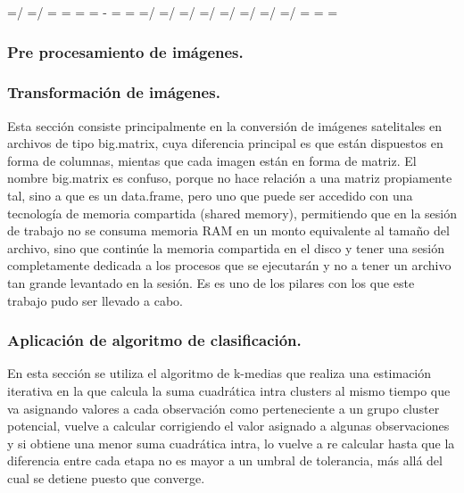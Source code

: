 \documentclass[]{article}
\makeatletter
\def\vcoef#1{#1=\dimexpr #1*\pdfpageheight/\paperheight\relax}
\def\hcoef#1{#1=\dimexpr #1*\pdfpagewidth/\paperwidth\relax}
\def\adjustpagedim#1#2{%
\newpage
\pdfpagewidth=#1 \pdfpageheight=#2
\hcoef\textwidth
\vcoef\textheight
\vsize=\textheight
\@colroom=\textheight
\@colht=\textheight
\columnwidth=\textwidth
\if@twocolumn%
   \advance\columnwidth-\columnsep
   \divide\columnwidth\tw@%
   \@firstcolumntrue%
\fi%
\hsize=\columnwidth
\linewidth=\hsize
\hcoef\evensidemargin
\hcoef\oddsidemargin
\vcoef\topmargin
\vcoef\headheight
\vcoef\headsep
\vcoef\footskip
\hcoef\marginparwidth
\hcoef\marginparsep
\headwidth=\textwidth
\paperwidth=\pdfpagewidth
\paperheight=\pdfpageheight}
\makeatother
\begin{document}
\newpage

\adjustpagedim{502.9mm}{388.6mm}

\subsubsection{Pre procesamiento de
imágenes.}\label{pre-procesamiento-de-imagenes.}



\newpage

\subsubsection{Transformación de
imágenes.}\label{transformacion-de-imagenes.}

Esta sección consiste principalmente en la conversión de imágenes
satelitales en archivos de tipo big.matrix, cuya diferencia principal es
que están dispuestos en forma de columnas, mientas que cada imagen están
en forma de matriz. El nombre big.matrix es confuso, porque no hace
relación a una matriz propiamente tal, sino a que es un data.frame, pero
uno que puede ser accedido con una tecnología de memoria compartida
(shared memory), permitiendo que en la sesión de trabajo no se consuma
memoria RAM en un monto equivalente al tamaño del archivo, sino que
continúe la memoria compartida en el disco y tener una sesión
completamente dedicada a los procesos que se ejecutarán y no a tener un
archivo tan grande levantado en la sesión. Es es uno de los pilares con
los que este trabajo pudo ser llevado a cabo.



\newpage

\subsubsection{Aplicación de algoritmo de
clasificación.}\label{aplicacion-de-algoritmo-de-clasificacion.}

En esta sección se utiliza el algoritmo de k-medias que realiza una
estimación iterativa en la que calcula la suma cuadrática intra clusters
al mismo tiempo que va asignando valores a cada observación como
perteneciente a un grupo cluster potencial, vuelve a calcular
corrigiendo el valor asignado a algunas observaciones y si obtiene una
menor suma cuadrática intra, lo vuelve a re calcular hasta que la
diferencia entre cada etapa no es mayor a un umbral de tolerancia, más
allá del cual se detiene puesto que converge.
\end{document}
